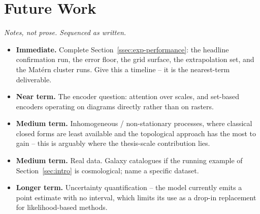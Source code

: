 \documentclass[11pt,letterpaper]{article}
\newcommand{\1}{\mathds{1}}
\theoremstyle{plain}
\theoremstyle{definitioncolon}
\begin{document}
\section{Future Work}
\label{sec:futurework}

\emph{Notes, not prose. Sequenced as written.}
\begin{itemize}
    \item \textbf{Immediate.} Complete Section~\ref{ssec:exp-performance}: the
    headline confirmation run, the error floor, the grid surface, the
    extrapolation set, and the Mat\'ern cluster runs. Give this a timeline --
    it is the nearest-term deliverable.
    \item \textbf{Near term.} The encoder question: attention over scales, and
    set-based encoders operating on diagrams directly rather than on rasters.
    \item \textbf{Medium term.} Inhomogeneous / non-stationary processes, where
    classical closed forms are least available and the topological approach has
    the most to gain -- this is arguably where the thesis-scale contribution
    lies.
    \item \textbf{Medium term.} Real data. Galaxy catalogues if the running
    example of Section~\ref{sec:intro} is cosmological; name a specific
    dataset.
    \item \textbf{Longer term.} Uncertainty quantification -- the model
    currently emits a point estimate with no interval, which limits its use as
    a drop-in replacement for likelihood-based methods.
\end{itemize}

\appendix
\end{document}
